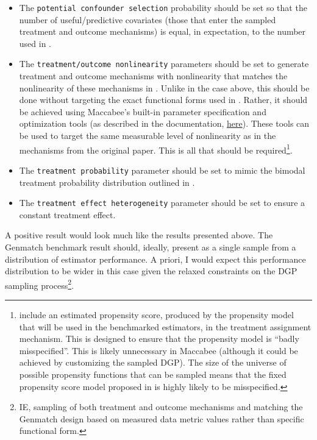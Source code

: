 \documentclass[../main.tex]{subfiles}
\begin{document}
\begin{itemize}
    \item The \texttt{potential confounder selection} probability should be set so that the number of useful/predictive covariates (those that enter the sampled treatment and outcome mechanisms) is equal, in expectation, to the number used in \textcite{Diamond2013GeneticStudies}.
    
    \item The \texttt{treatment/outcome nonlinearity} parameters should be set to generate treatment and outcome mechanisms with nonlinearity that matches the nonlinearity of these mechanisms in \textcite{Diamond2013GeneticStudies}. Unlike in the case above, this should be done without targeting the exact functional forms used in \textcite{Diamond2013GeneticStudies}. Rather, it should be achieved using Maccabee's built-in parameter specification and optimization tools (as described in the documentation, \href{\RTDurl/usage/custom-sampled-dgp.html}{here}). These tools can be used to target the same measurable level of nonlinearity as in the mechanisms from the original paper. This is all that should be required\footnote{\citeauthor{Diamond2013GeneticStudies} include an estimated propensity score, produced by the propensity model that will be used in the benchmarked estimators, in the treatment assignment mechanism. This is designed to ensure that the propensity model is ``badly misspecified''. This is likely unnecessary in Maccabee (although it could be achieved by customizing the sampled DGP). The size of the universe of possible propensity functions that can be sampled means that the fixed propensity score model proposed in \textcite{Diamond2013GeneticStudies} is highly likely to be misspecified.}.
    
    \item The \texttt{treatment probability} parameter should be set to mimic the bimodal treatment probability distribution outlined in \textcite{Diamond2013GeneticStudies}.
    
    \item The \texttt{treatment effect heterogeneity} parameter should be set to ensure a constant treatment effect.
\end{itemize}

A positive result would look much like the results presented above. The Genmatch benchmark result should, ideally, present as a single sample from a distribution of estimator performance. A priori, I would expect this performance distribution to be wider in this case given the relaxed constraints on the DGP sampling process\footnote{IE, sampling of both treatment and outcome mechanisms and matching the Genmatch design based on measured data metric values rather than specific functional form.}.
\end{document}
